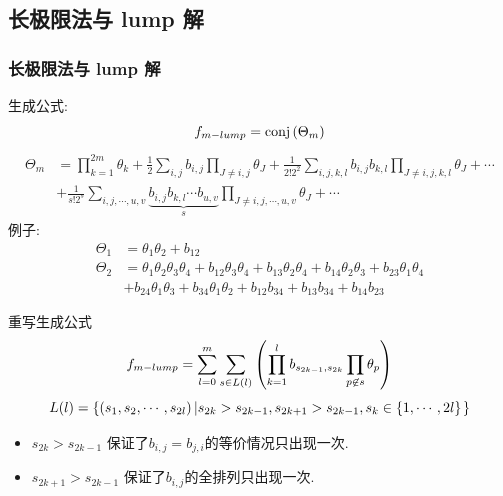 \subsection{长极限法与 lump 解}
\begin{frame}
\frametitle{长极限法与 lump 解}
生成公式:
\[
    f_{m-lump}={\rm conj}\left(\Theta_m\right)
\]
\[
\begin{split}
    \Theta_m&=\prod_{k=1}^{2m}\theta_k+\frac{1}{2}\sum_{i,j}{b_{i,j}}\prod_{J\neq i,j}{\theta_J}+\frac{1}{2! 2^2}\sum_{i,j,k,l}{b_{i,j}b_{k,l}}\prod_{J\neq i,j,k,l}{\theta_{J}}+\cdots \\
    &+\frac{1}{s!2^s}\sum_{i,j,\cdots,u,v}\underbrace{{b_{i,j}b_{k,l}\cdots b_{u,v}}}_{s}\prod_{J\neq i,j,\cdots, u,v}{\theta_J}+\cdots 
\end{split}
\]
例子:
\[
\begin{split}
\Theta_1&=\theta_{1}\theta_{2}+b_{12} \\
\Theta_2&=\theta_{1}\theta_{2}\theta_{3}\theta_{4}+b_{12}\theta_{3}\theta_{4}+b_{13}\theta_{2}\theta_{4}+b_{14}\theta_{2}\theta_{3}+b_{23}\theta_{1}\theta_{4}\\
&+b_{24}\theta_{1}\theta_{3}+b_{34}\theta_{1}\theta_{2}+b_{12}b_{34}+b_{13}b_{34}+b_{14}b_{23}
\end{split}
\]
\end{frame}

\begin{frame}
重写生成公式
\[
    f_{m-lump}=\sum_{l=0}^m\sum_{s\in L(l)}\left(\prod_{k=1}^l{b_{s_{2k-1},s_{2k}}}\prod_{p\not\in s}{\theta_p}\right)
\]
\[
    L(l)=\left\{\left(s_1, s_2, \cdots ,s_{2l}\right)\left|s_{2k}>s_{2k-1},s_{2k+1}>s_{2k-1},s_k\in \left\{1,\cdots,2l\right\}\right.\right\}
\]
\begin{itemize}
\item $s_{2k}>s_{2k-1}$ 保证了$b_{i,j}=b_{j,i}$的等价情况只出现一次. 
\item $s_{2k+1}>s_{2k-1}$ 保证了$b_{i,j}$的全排列只出现一次.
\end{itemize}
\end{frame}

